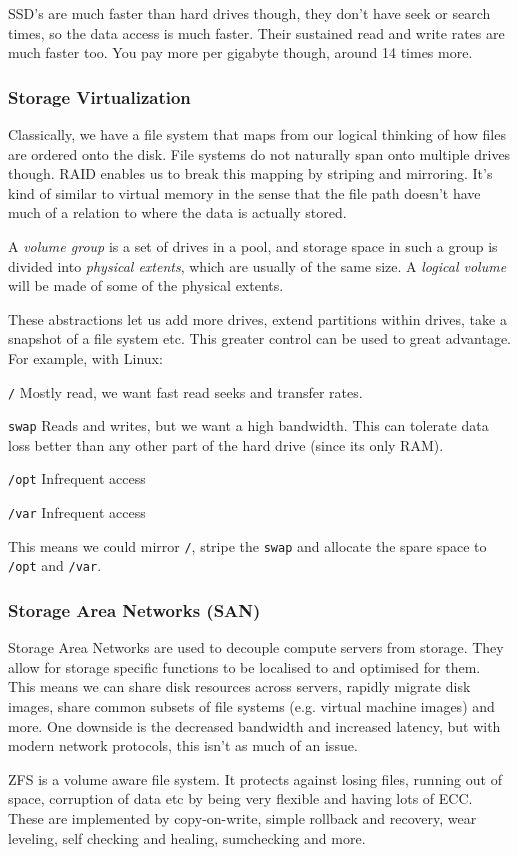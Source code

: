 SSD's are much faster than hard drives though, they don't have seek or search
times, so the data access is much faster. Their sustained read and write rates
are much faster too. You pay more per gigabyte though, around 14 times more.

\subsubsection{Storage Virtualization}

Classically, we have a file system that maps from our logical thinking of how
files are ordered onto the disk. File systems do not naturally span onto
multiple drives though. RAID enables us to break this mapping by striping and
mirroring. It's kind of similar to virtual memory in the sense that the file
path doesn't have much of a relation to where the data is actually stored.

A \textit{volume group} is a set of drives in a pool, and storage space in such
a group is divided into \textit{physical extents}, which are usually of the same
size. A \textit{logical volume} will be made of some of the physical extents.

These abstractions let us add more drives, extend partitions within drives, take
a snapshot of a file system etc. This greater control can be used to great
advantage. For example, with Linux:

\begin{description}
  \item \texttt{/} Mostly read, we want fast read seeks and transfer rates.
  \item \texttt{swap} Reads and writes, but we want a high bandwidth. This can
  tolerate data loss better than any other part of the hard drive (since its
  only RAM).
  \item \texttt{/opt} Infrequent access
  \item \texttt{/var} Infrequent access
\end{description}

This means we could mirror \texttt{/}, stripe the \texttt{swap} and allocate the
spare space to \texttt{/opt} and \texttt{/var}.

\subsubsection{Storage Area Networks (SAN)}

Storage Area Networks are used to decouple compute servers from storage. They
allow for storage specific functions to be localised to and optimised for them.
This means we can share disk resources across servers, rapidly migrate disk
images, share common subsets of file systems (e.g. virtual machine images) and
more. One downside is the decreased bandwidth and increased latency, but with
modern network protocols, this isn't as much of an issue.

ZFS is a volume aware file system. It protects against losing files, running out
of space, corruption of data etc by being very flexible and having lots of ECC.
These are implemented by copy-on-write, simple rollback and recovery, wear
leveling, self checking and healing, sumchecking and more.
